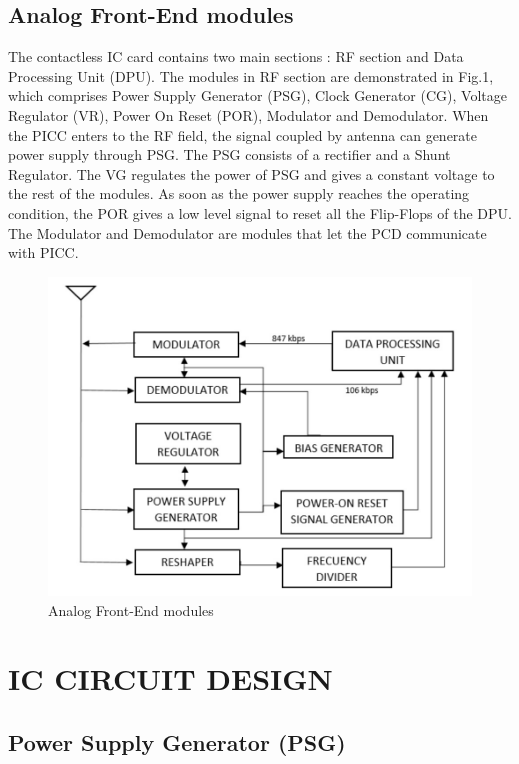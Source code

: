 \documentclass{article} %
\begin{document}
\begin{multicols}{2}
\subsection{Analog Front-End modules}

The contactless IC card contains two main sections \cite{c10}: RF section and Data Processing Unit (DPU). The modules in RF section are demonstrated in Fig.1, which comprises Power Supply Generator (PSG), Clock Generator (CG), Voltage Regulator (VR), Power On Reset (POR), Modulator and Demodulator.
When the PICC enters to the RF field, the signal coupled by antenna can generate power supply through PSG. The PSG consists of a rectifier and a Shunt Regulator. The VG regulates the power of PSG and gives a constant voltage to the rest of the modules. As soon as the power supply reaches the operating condition, the POR gives a low level signal to reset all the Flip-Flops of the DPU. The Modulator and Demodulator are modules that let the PCD communicate with PICC.


\begin{figure}[H]
\centering
\includegraphics[scale=0.3]{Images/ImagenesTesina/modulos_rfid.png}
\caption{Analog Front-End modules}
\label{fig:modulos_rfid}
\end{figure}

\section{IC CIRCUIT DESIGN}

\subsection{Power Supply Generator (PSG)}


\end{multicols}
\end{document}
